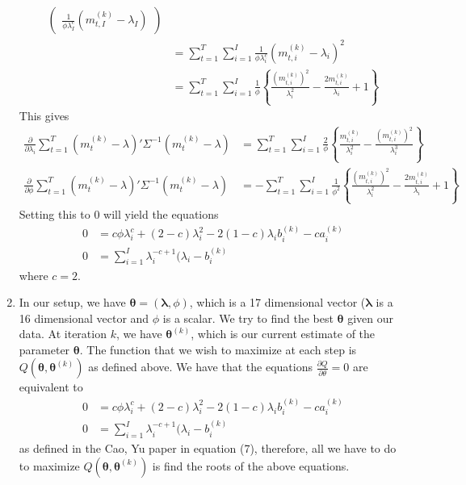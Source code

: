 \documentclass[letterpaper,10pt]{amsart}
\begin{document}
\begin{enumerate}[{1}.1]
\begin{align*}
\begin{pmatrix}
\frac{1}{\phi \lambda_I^c}  (m_{t,I}^{(k)} - \lambda_I)
\end{pmatrix}\\
&= \sum_{t=1}^T \sum_{i=1}^I \frac{1}{\phi \lambda_i^c} (m_{t,i}^{(k)} - \lambda_i)^2\\
&= \sum_{t=1}^T \sum_{i=1}^I \frac{1}{\phi}\left\{\frac{(m_{t,i}^{(k)})^2}{\lambda_i^2} - \frac{2m_{t,i}^{(k)}}{\lambda_i} + 1 \right\}
\end{align*}
This gives
\begin{align*}
\frac{\partial}{\partial \lambda_i} \sum_{t=1}^T (m_t^{(k)} - \lambda)' \Sigma^{-1}  (m_t^{(k)} - \lambda)  &= \sum_{t=1}^T \sum_{i=1}^I \frac{2}{\phi}\left\{\frac{m_{t,i}^{(k)}}{\lambda_i^2} - \frac{(m_{t,i}^{(k)})^2}{\lambda_i^3}\right\}\\
\frac{\partial}{\partial \phi}\sum_{t=1}^T (m_t^{(k)} - \lambda)' \Sigma^{-1}  (m_t^{(k)} - \lambda)  &= -\sum_{t=1}^T \sum_{i=1}^I \frac{1}{\phi^2}\left\{\frac{(m_{t,i}^{(k)})^2}{\lambda_i^2} - \frac{2m_{t,i}^{(k)}}{\lambda_i} +1 \right\}
\end{align*}
Setting this to 0 will yield the equations
\begin{align*}
0 &= c \phi \lambda_i^c + (2-c)\lambda_i^2 - 2(1-c)\lambda_i b_i^{(k)} - c a_i^{(k)}\\
0 &= \sum_{i=1}^I \lambda_i^{-c+1}(\lambda_i - b_i^{(k)}
\end{align*}
where $c=2$.

\item 
In our setup, we have $\boldsymbol \theta = (\boldsymbol \lambda, \phi)$, which is a 17 dimensional vector ($\boldsymbol \lambda$ is a 16 dimensional vector and $\phi$ is a scalar. We try to find the best $\boldsymbol \theta$ given our data. At iteration $k$, we have $\boldsymbol \theta^{(k)}$, which is our current estimate of the parameter $\boldsymbol \theta$. The function that we wish to maximize at each step is $Q(\boldsymbol \theta, \boldsymbol \theta^{(k)})$ as defined above. We have that the equations $\frac{\partial Q}{\partial \theta}=0$ are equivalent to 
\begin{align*}
0 &= c \phi \lambda_i^c + (2-c)\lambda_i^2 - 2(1-c)\lambda_i b_i^{(k)} - c a_i^{(k)}\\
0 &= \sum_{i=1}^I \lambda_i^{-c+1}(\lambda_i - b_i^{(k)}
\end{align*}
as defined in the Cao, Yu paper in equation (7), therefore, all we have to do to maximize $Q(\boldsymbol \theta, \boldsymbol \theta^{(k)})$ is find the roots of the above equations. 


\end{enumerate}
\end{document}
